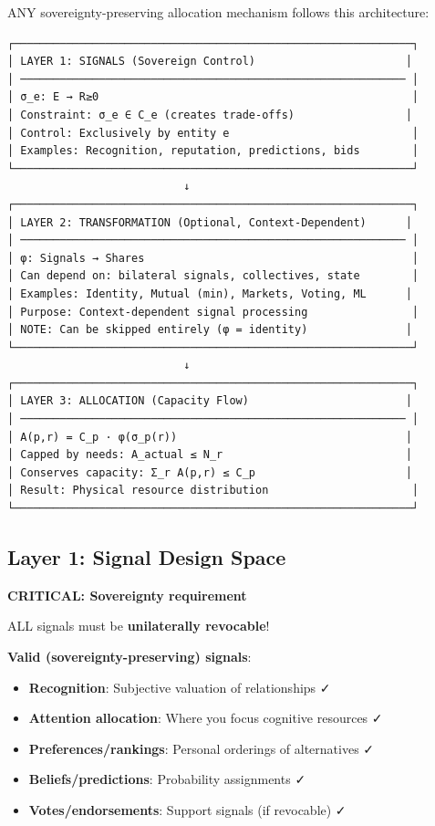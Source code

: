 \documentclass[11pt,a4paper]{article}
\theoremstyle{definition}
\theoremstyle{remark}
\begin{document}
ANY sovereignty-preserving allocation mechanism follows this architecture:

\begin{verbatim}
┌─────────────────────────────────────────────────────────────┐
│ LAYER 1: SIGNALS (Sovereign Control)                       │
│ ─────────────────────────────────────────────────────────── │
│ σ_e: E → R≥0                                                │
│ Constraint: σ_e ∈ C_e (creates trade-offs)                 │
│ Control: Exclusively by entity e                            │
│ Examples: Recognition, reputation, predictions, bids        │
└─────────────────────────────────────────────────────────────┘
                           ↓
┌─────────────────────────────────────────────────────────────┐
│ LAYER 2: TRANSFORMATION (Optional, Context-Dependent)      │
│ ─────────────────────────────────────────────────────────── │
│ φ: Signals → Shares                                         │
│ Can depend on: bilateral signals, collectives, state        │
│ Examples: Identity, Mutual (min), Markets, Voting, ML      │
│ Purpose: Context-dependent signal processing                │
│ NOTE: Can be skipped entirely (φ = identity)               │
└─────────────────────────────────────────────────────────────┘
                           ↓
┌─────────────────────────────────────────────────────────────┐
│ LAYER 3: ALLOCATION (Capacity Flow)                        │
│ ─────────────────────────────────────────────────────────── │
│ A(p,r) = C_p · φ(σ_p(r))                                   │
│ Capped by needs: A_actual ≤ N_r                            │
│ Conserves capacity: Σ_r A(p,r) ≤ C_p                       │
│ Result: Physical resource distribution                      │
└─────────────────────────────────────────────────────────────┘
\end{verbatim}

\subsection{Layer 1: Signal Design Space}

\textbf{CRITICAL: Sovereignty requirement}

ALL signals must be \textbf{unilaterally revocable}!

\textbf{Valid (sovereignty-preserving) signals}:
\begin{itemize}
\item \textbf{Recognition}: Subjective valuation of relationships ✓
\item \textbf{Attention allocation}: Where you focus cognitive resources ✓
\item \textbf{Preferences/rankings}: Personal orderings of alternatives ✓
\item \textbf{Beliefs/predictions}: Probability assignments ✓
\item \textbf{Votes/endorsements}: Support signals (if revocable) ✓
\end{itemize}
\end{document}
